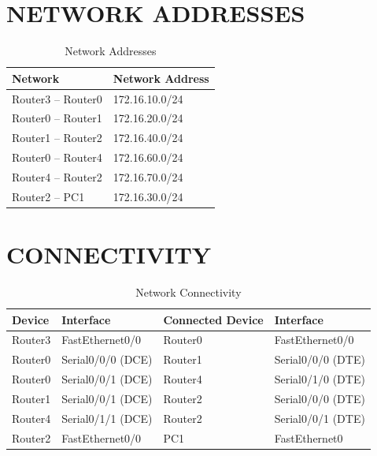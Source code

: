 \documentclass[12pt,a4paper]{article}
\begin{document}
\section*{NETWORK ADDRESSES}
\begin{table}[H]
	\centering
	\begin{tabular}{|l|l|}
		\hline
		\textbf{Network} & \textbf{Network Address} \\ \hline
		Router3 -- Router0 & 172.16.10.0/24 \\ \hline
		Router0 -- Router1 & 172.16.20.0/24 \\ \hline
		Router1 -- Router2 & 172.16.40.0/24 \\ \hline
		Router0 -- Router4 & 172.16.60.0/24 \\ \hline
		Router4 -- Router2 & 172.16.70.0/24 \\ \hline
		Router2 -- PC1     & 172.16.30.0/24 \\ \hline
	\end{tabular}
	\caption{Network Addresses}
\end{table}

\section*{CONNECTIVITY}
\begin{table}[H]
	\centering
	\begin{tabular}{|l|l|l|l|}
		\hline
		\textbf{Device} & \textbf{Interface} & \textbf{Connected Device} & \textbf{Interface} \\ \hline
		Router3 & FastEthernet0/0   & Router0 & FastEthernet0/0   \\ \hline
		Router0 & Serial0/0/0 (DCE) & Router1 & Serial0/0/0 (DTE) \\ \hline
		Router0 & Serial0/0/1 (DCE) & Router4 & Serial0/1/0 (DTE) \\ \hline
		Router1 & Serial0/0/1 (DCE) & Router2 & Serial0/0/0 (DTE) \\ \hline
		Router4 & Serial0/1/1 (DCE) & Router2 & Serial0/0/1 (DTE) \\ \hline
		Router2 & FastEthernet0/0   & PC1     & FastEthernet0     \\ \hline
	\end{tabular}
	\caption{Network Connectivity}
\end{table}
\end{document}

